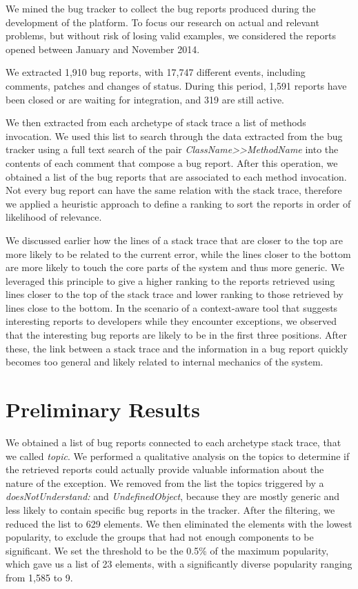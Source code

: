 We mined the \pha bug tracker to collect the bug reports produced during the development of the platform.
To focus our research on actual and relevant problems, but without risk of losing valid examples, we considered the reports opened between January and November 2014.

We extracted 1,910 bug reports, with 17,747 different events, including comments, patches and changes of status.
During this period, 1,591 reports have been closed or are waiting for integration, and 319 are still active.

We then extracted from each archetype of stack trace a list of methods invocation.
We used this list to search through the data extracted from the bug tracker using a full text search of the pair \emph{ClassName{>}{>}MethodName} into the contents of each comment that compose a bug report.
After this operation, we obtained a list of the bug reports that are associated to each method invocation.
Not every bug report can have the same relation with the stack trace, therefore we applied a heuristic approach to define a ranking to sort the reports in order of likelihood of relevance.

We discussed earlier how the lines of a stack trace that are closer to the top are more likely to be related to the current error, while the lines closer to the bottom are more likely to touch the core parts of the system and thus more generic.
We leveraged this principle to give a higher ranking to the reports retrieved using lines closer to the top of the stack trace and lower ranking to those retrieved by lines close to the bottom.
In the scenario of a context-aware tool that suggests interesting reports to developers while they encounter exceptions, we observed that the interesting bug reports are likely to be in the first three positions.
After these, the link between a stack trace and the information in a bug report quickly becomes too general and likely related to internal mechanics of the system.



\section{Preliminary Results}\label{sec:stacktraces-evaluation}

We obtained a list of bug reports connected to each archetype stack trace, that we called \emph{topic}.
We performed a qualitative analysis on the topics to determine if the retrieved reports could actually provide valuable information about the nature of the exception.
We removed from the list the topics triggered by a \emph{doesNotUnderstand:} and \emph{UndefinedObject}, because they are mostly generic and less likely to contain specific bug reports in the tracker.
After the filtering, we reduced the list to 629 elements.
We then eliminated the elements with the lowest popularity, to exclude the groups that had not enough components to be significant.
We set the threshold to be the 0.5\% of the maximum popularity, which gave us a list of 23 elements, with a significantly diverse popularity ranging from 1,585 to 9.

